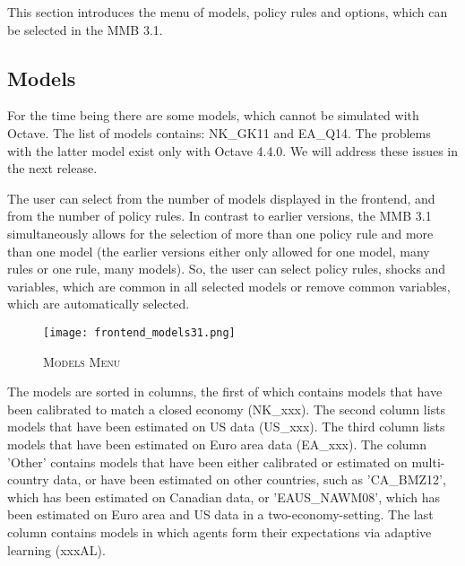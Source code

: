 This section introduces the menu of models, policy rules and options, which can be selected in the MMB 3.1.
\subsection*{Models}
For the time being there are some models, which cannot be simulated with Octave. The list of models contains: NK\_GK11 and EA\_Q14. The problems with the latter model exist only with Octave 4.4.0. We will address these issues in the next release.

The user can select from the number of models displayed in the frontend, and from the number of policy rules. In contrast to earlier versions, the MMB 3.1 simultaneously allows for the selection of more than one policy rule and more than one model (the earlier versions either only allowed for one model, many rules or one rule, many models).  So, the user can select policy rules, shocks and variables, which are common in all selected models or remove common variables, which are automatically selected.


\begin{figure}[H]
	\centering
	\caption{\textsc{Models Menu}}
	\vspace{0.2cm}
	\texttt{[image: frontend\_models31.png]}\\
	\label{img:Models}
\end{figure}

The models are sorted in columns, the first of which contains models that have been calibrated to match a closed economy (NK\_xxx). The second column lists models that have been estimated on US data (US\_xxx). The third column lists models that have been estimated on Euro area data (EA\_xxx). The column 'Other' contains models that have been either calibrated or estimated on multi-country data, or have been estimated on other countries, such as 'CA\_BMZ12', which has been estimated on Canadian data, or 'EAUS\_NAWM08', which has been estimated on Euro area and US data in a two-economy-setting. The last column contains models in which agents form their expectations via adaptive learning (xxxAL). 


